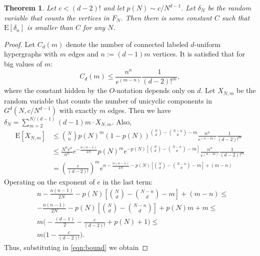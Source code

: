 \documentclass[11pt,notitlepage,a4paper]{article}
\newtheorem{theorem}{Theorem}[section]
\theoremstyle{definition}
\begin{document}
\begin{theorem} \label{thm:sizefragment}
	Let $c<(d-2)!$ and let $p(N)\sim c/N^{d-1}$. Let $\delta_N$ be the
	random variable that counts the vertices in $F_N$. 
	Then there is some constant $C$ such that 
	$\mathrm{E}[\delta_n]$ is smaller than $C$ for any $N$. 
\end{theorem}
\begin{proof}
	Let $C_d(m)$ denote the number of connected labeled $d$-uniform
	hypergraphs with $m$ edges and $n:=(d-1)m$ vertices. It is satisfied 
	that for big values of $m$:
	\[C_d(m)\leq \frac{n^n}{e^{(m-n)}}\frac{1}{(d-2)!^m},\]
	where the constant hidden by the $O$-notation depends only on $d$.
	Let $X_{N,m}$ be the random variable that counts the number of
	unicyclic components in $G^d(N,c/N^{d-1})$ with exactly $m$ edges.
	Then we have $\delta_N =\sum_{m=2}^{N/(d-1)} (d-1)m \cdot X_{N,m}$.
	Also,
	\begin{align}
	\nonumber \mathrm{E}[X_{N,m}] & \leq 
	\binom{N}{n} p(N)^m
	(1-p(N))^{\binom{N}{d}-\binom{N-n}{d} - m}  \frac{n^n}{e^{(n-m)}}\frac{1}{(d-2)!^m}\\ 
	&\nonumber \leq \frac{N^ne^n}{n^n}e^{-\frac{n(n-1)}{2N}}p(N)^m
	e^{-p(N)\left[\binom{N}{d}-\binom{N-n}{d} - m\right]}
	\frac{n^n}{e^{(n-m)}}\frac{1}{(d-2)!^m}\\
	&\label{eqn:bound} =\left(\frac{c}{(d-2)!}\right)^m e^{n-\frac{n(n-1)}{2N}
	-p(N)\left[\binom{N}{d}-\binom{N-n}{d} - m\right]+ 
	(m-n)} 
	\end{align}
	Operating on the exponent of $e$ in the last term:
	\begin{align*}
	&n-\frac{n(n-1)}{2N}
	-p(N)\left[\binom{N}{d}-\binom{N-n}{d} - m\right]+ 
	(m-n)\leq\\ 
	&- \frac{n(n-1)}{2N} - p(N)\left[\binom{N}{d}-\binom{N-n}{d}\right]
	+ p(N)m + m \leq \\
	& m\Big(-\frac{(d-1)}{2} - \frac{c}{(d-2)!} + p(N) + 1\Big)	\leq \\
	& m\Big(1 - \frac{c}{(d-2)!} \Big).	
	\end{align*}
	Thus, substituting in \cref{eqn:bound} we obtain

\end{proof}
\end{document}
